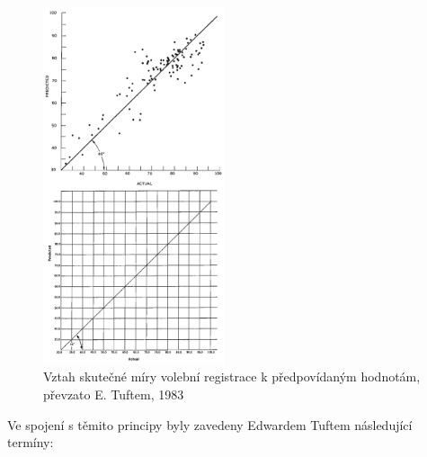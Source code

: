 \documentclass[12pt,]{article}
\begin{document}
\begin{minipage}[H]{0.475\textwidth}
\begin{figure}[H]
    \includegraphics[height = 10.5cm]{fig/data_ink}
    \caption{Vztah skutečné míry volební registrace k předpovídaným hodnotám, převzato E. Tuftem, 1983}
    \label{fig06}
 \end{figure}
\end{minipage}

Ve spojení s těmito principy byly zavedeny Edwardem Tuftem následující
termíny:
\end{document}
